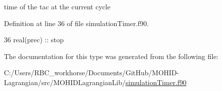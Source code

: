 time of the tac at the current cycle 



Definition at line 36 of file simulation\+Timer.\+f90.


\begin{DoxyCode}
36         \textcolor{keywordtype}{real(prec)} :: stop
\end{DoxyCode}


The documentation for this type was generated from the following file\+:\begin{DoxyCompactItemize}
\item 
C\+:/\+Users/\+R\+B\+C\+\_\+workhorse/\+Documents/\+Git\+Hub/\+M\+O\+H\+I\+D-\/\+Lagrangian/src/\+M\+O\+H\+I\+D\+Lagrangian\+Lib/\mbox{\hyperlink{simulation_timer_8f90}{simulation\+Timer.\+f90}}\end{DoxyCompactItemize}
